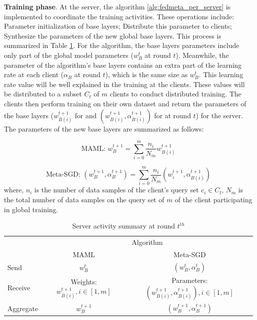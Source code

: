 \documentclass[runningheads]{llncs}
\begin{document}
\textbf{Training phase}. At the server, the algorithm \ref{alg:fedmeta_per_server} is implemented to coordinate the training activities. These operations include: Parameter initialization of base layers; Distribute this parameter to clients; Synthesize the parameters of the new global base layers. This process is summarized in Table \ref{tab:param_fedmetaper}. For the  algorithm, the base layers parameters include only part of the global model parameters ($w_B^t$ at round $t$). Meanwhile, the parameter of the  algorithm's base layers contains an extra part of the learning rate at each client ($\alpha_B$ at round $t$), which is the same size as $w_B^t$. This learning rate value will be well explained in the training at the clients. These values will be distributed to a subset $C_t$ of $m$ clients to conduct distributed training. The clients then perform training on their own dataset and return the parameters of the base layers ($w_{B(i)}^{t+1}$ for  and $( w_{B(i)}^{t+1}, \alpha_{B(i)}^{t+1})$ for  at round $t$) for the server. The parameters of the new base layers are summarized as follows:

\begin{dmath}
    \text{MAML: } w_{B}^{t+1} = \sum_{i=0}^m \frac{n_i}{N_m} w_{B(i)}^{t+1}
\end{dmath}

\begin{dmath}
    \text{Meta-SGD: } (w_B^{t+1}, \alpha_B^{t+1}) = \sum_{i=0}^m \frac{n_i}{N_m} (w_i^{t+1}, \alpha_{B(i)}^{t+1})
\end{dmath} where, $n_i$ is the number of data samples of the client's query set $c_i\in C_t$, $N_m$ is the total number of data samples on the query set of $m$ of the client participating in global training.

\begin{table}[h]
    \centering
    \caption{Server activity summary at round $t^{th}$}
    \label{tab:param_fedmetaper}
    \begin{tabular}{l|c|c} 
    \toprule
    \multirow{2}{*}{} & \multicolumn{2}{c}{Algorithm}                                               \\ 
    \cline{2-3}
                      & MAML                          & Meta-SGD                                     \\ 
    \hline
    Send              & $w_B^t$                                & $(w_B^t, \alpha_B^t)$                        \\
    Receive           & Weights: $w_{B(i)}^{t+1}, i\in [1,m]$  & Parameters: $(w_{B(i)}^{t+1}, \alpha_{B(i)}^{t+1}), i\in [1,m]$  \\
    Aggregate         & $w_{B}^{t+1}$                          & $(w_B^{t+1}, \alpha_B^{t+1})$                    \\
    \bottomrule
    \end{tabular}
\end{table}
\end{document}
